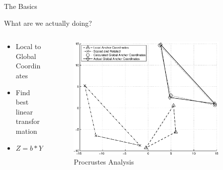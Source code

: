 \documentclass{beamer}
\begin{document}
\begin{frame}{The Basics}
\begin{block}{What are we actually doing?}
\begin{columns}
	\begin{column}{0.3\textwidth}
		\begin{itemize}
		\item Local to Global Coordinates
		\item Find best linear transformation
		\item $Z = b*Y*T + c$
		\end{itemize}
		\vfil
	\end{column}
	\begin{column}{0.7\textwidth}
		\begin{figure}
			\centering	
				\includegraphics[width=0.9\textwidth]{SampleAnchors}
				\caption{Procrustes Analysis}
		\end{figure}
	\end{column}
\end{columns}
\end{block}
\end{frame}
\end{document}
